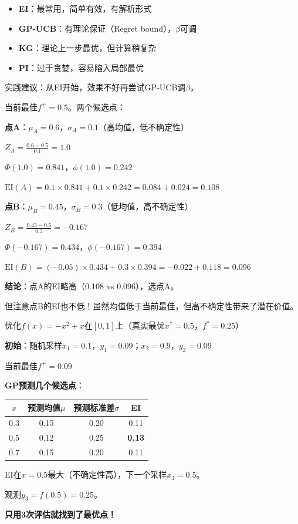 \documentclass[11pt,a4paper]{article}
\theoremstyle{definition}
\begin{document}
\begin{plainwords}[选哪个采集函数]
\begin{itemize}
    \item \textbf{EI}：最常用，简单有效，有解析形式
    \item \textbf{GP-UCB}：有理论保证（Regret bound），$\beta$可调
    \item \textbf{KG}：理论上一步最优，但计算稍复杂
    \item \textbf{PI}：过于贪婪，容易陷入局部最优
\end{itemize}

实践建议：从EI开始，效果不好再尝试GP-UCB调$\beta$。
\end{plainwords}

\begin{calculation}[EI的数值计算]
当前最佳$f^+ = 0.5$。两个候选点：

\textbf{点A}：$\mu_A = 0.6$，$\sigma_A = 0.1$（高均值，低不确定性）

$Z_A = \frac{0.6 - 0.5}{0.1} = 1.0$

$\Phi(1.0) = 0.841$，$\phi(1.0) = 0.242$

$\text{EI}(A) = 0.1 \times 0.841 + 0.1 \times 0.242 = 0.084 + 0.024 = 0.108$

\textbf{点B}：$\mu_B = 0.45$，$\sigma_B = 0.3$（低均值，高不确定性）

$Z_B = \frac{0.45 - 0.5}{0.3} = -0.167$

$\Phi(-0.167) = 0.434$，$\phi(-0.167) = 0.394$

$\text{EI}(B) = (-0.05) \times 0.434 + 0.3 \times 0.394 = -0.022 + 0.118 = 0.096$

\textbf{结论}：点A的EI略高（0.108 vs 0.096），选点A。

但注意点B的EI也不低！虽然均值低于当前最佳，但高不确定性带来了潜在价值。
\end{calculation}

\begin{calculation}[完整贝叶斯优化流程]
优化$f(x) = -x^2 + x$在$[0,1]$上（真实最优$x^* = 0.5$，$f^* = 0.25$）

\textbf{初始}：随机采样$x_1 = 0.1$，$y_1 = 0.09$；$x_2 = 0.9$，$y_2 = 0.09$

当前最佳$f^+ = 0.09$

\textbf{GP预测几个候选点}：

\begin{center}
\begin{tabular}{c|c|c|c}
\toprule
$x$ & 预测均值$\mu$ & 预测标准差$\sigma$ & EI \\
\midrule
0.3 & 0.15 & 0.20 & 0.11 \\
0.5 & 0.12 & 0.25 & \textbf{0.13} \\
0.7 & 0.15 & 0.20 & 0.11 \\
\bottomrule
\end{tabular}
\end{center}

EI在$x=0.5$最大（不确定性高），下一个采样$x_3 = 0.5$。

观测$y_3 = f(0.5) = 0.25$。

\textbf{只用3次评估就找到了最优点！}
\end{calculation}
\end{document}
